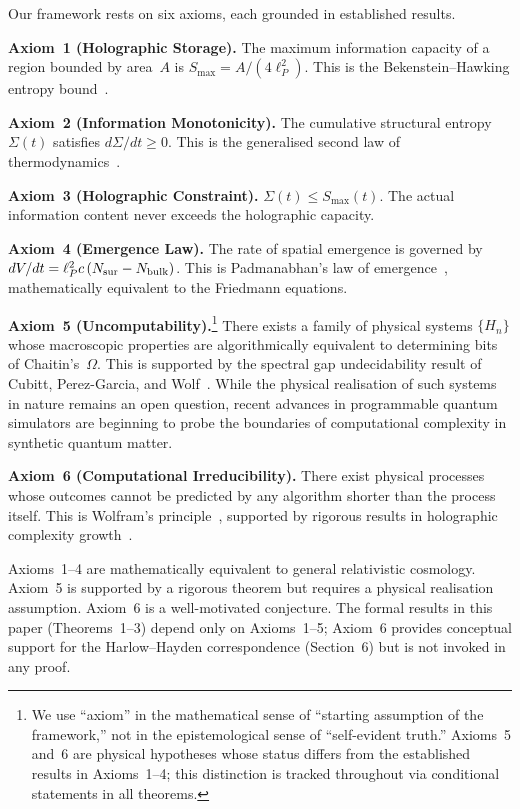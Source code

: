 \documentclass[12pt,a4paper]{article}
\theoremstyle{remark}
\begin{document}
Our framework rests on six axioms, each grounded in established results.

\textbf{Axiom~1 (Holographic Storage).}
The maximum information capacity of a region bounded by area~$A$ is $S_{\max} = A/(4\ell_P^2)$.
This is the Bekenstein--Hawking entropy bound~\cite{Bekenstein1973,Hawking1975}.

\textbf{Axiom~2 (Information Monotonicity).}
The cumulative structural entropy $\Sigma(t)$ satisfies $d\Sigma/dt \ge 0$.
This is the generalised second law of thermodynamics~\cite{Bekenstein1974}.

\textbf{Axiom~3 (Holographic Constraint).}
$\Sigma(t) \le S_{\max}(t)$.
The actual information content never exceeds the holographic capacity.

\textbf{Axiom~4 (Emergence Law).}
The rate of spatial emergence is governed by $dV/dt = \ell_P^2 c\,(N_{\rm sur} - N_{\rm bulk})$.
This is Padmanabhan's law of emergence~\cite{Padmanabhan2012}, mathematically equivalent to the Friedmann equations.

\textbf{Axiom~5 (Uncomputability).}\footnote{We use ``axiom'' in the mathematical sense of ``starting assumption of the framework,'' not in the epistemological sense of ``self-evident truth.''
Axioms~5 and~6 are physical hypotheses whose status differs from the established results in Axioms~1--4; this distinction is tracked throughout via conditional statements in all theorems.}
There exists a family of physical systems $\{H_n\}$ whose macroscopic properties are algorithmically equivalent to determining bits of Chaitin's~$\Omega$.
This is supported by the spectral gap undecidability result of Cubitt, Perez-Garcia, and Wolf~\cite{Cubitt2015}.
While the physical realisation of such systems in nature remains an open question, recent advances in programmable quantum simulators are beginning to probe the boundaries of computational complexity in synthetic quantum matter.

\textbf{Axiom~6 (Computational Irreducibility).}
There exist physical processes whose outcomes cannot be predicted by any algorithm shorter than the process itself.
This is Wolfram's principle~\cite{Wolfram2002}, supported by rigorous results in holographic complexity growth~\cite{Bouland2018}.

Axioms~1--4 are mathematically equivalent to general relativistic cosmology.
Axiom~5 is supported by a rigorous theorem but requires a physical realisation assumption.
Axiom~6 is a well-motivated conjecture.
The formal results in this paper (Theorems~1--3) depend only on Axioms~1--5; Axiom~6 provides conceptual support for the Harlow--Hayden correspondence (Section~6) but is not invoked in any proof.
\end{document}
